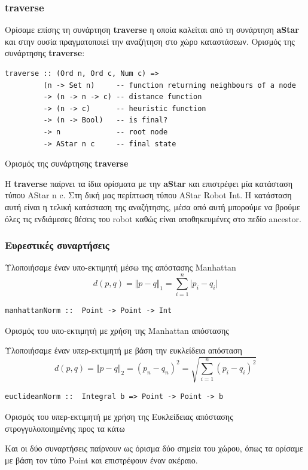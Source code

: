 \documentclass[12pt]{article}
\begin{document}
\subsubsection{traverse}
Ορίσαμε επίσης τη συνάρτηση \textbf{traverse} η οποία καλείται από τη συνάρτηση \textbf{aStar} και στην ουσία πραγματοποιεί την αναζήτηση στο χώρο καταστάσεων.
Oρισμός της συνάρτησης \textbf{traverse}: 
\begin{listing}[H]
\begin{verbatim}
traverse :: (Ord n, Ord c, Num c) =>
         (n -> Set n)     -- function returning neighbours of a node
         -> (n -> n -> c) -- distance function
         -> (n -> c)      -- heuristic function
         -> (n -> Bool)   -- is final?
         -> n             -- root node
         -> AStar n c     -- final state
\end{verbatim}
\caption{Oρισμός της συνάρτησης \textbf{traverse}}
\end{listing}

Η \textbf{traverse} παίρνει τα ίδια ορίσματα με την \textbf{aStar} και επιστρέφει μία κατάσταση τύπου AStar n c. Στη δική μας περίπτωση τύπου AStar Robot Int. Η κατάσταση αυτή είναι η τελική κατάσταση της αναζήτησης, μέσα από αυτή μπορούμε να βρούμε όλες τις ενδιάμεσες θέσεις του robot καθώς είναι αποθηκευμένες στο πεδίο ancestor.
\subsubsection{Ευρεστικές συναρτήσεις}

Υλοποιήσαμε έναν υπο-εκτιμητή μέσω της απόστασης Manhattan
$$d(p,q) = \Vert p - q \Vert_1 = \sum_{i=1}^{n} \vert p_i - q_i \vert$$
\begin{listing}[H]
\begin{verbatim}
manhattanNorm ::  Point -> Point -> Int
\end{verbatim}
\caption{Ορισμός του υπο-εκτιμητή με χρήση της Manhattan απόστασης}
\end{listing}
Υλοποιήσαμε έναν υπερ-εκτιμητή με βάση την ευκλείδεια απόσταση
$$d(p,q) = \Vert p - q \Vert_2 = (p_n-q_n)^2 = \sqrt{\sum_{i=1}^{n} (p_i-q_i)^2}$$
\begin{listing}[H]
\begin{verbatim}
euclideanNorm ::  Integral b => Point -> Point -> b
\end{verbatim}
\caption{Ορισμός του υπερ-εκτιμητή με χρήση της Ευκλείδειας απόστασης στρογγυλοποιημένης προς τα κάτω}
\end{listing}
Και οι δύο συναρτήσεις παίρνουν ως όρισμα δύο σημεία του χώρου, όπως τα ορίσαμε με βάση τον τύπο Point και επιστρέφουν έναν ακέραιο.
\end{document}
